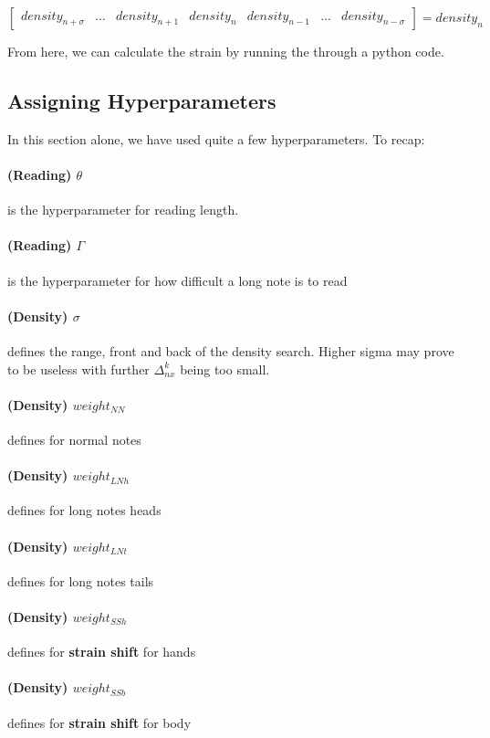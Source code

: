 $$
\begin{bmatrix}
	density_{n+\sigma} & \dots & density_{n+1} & density_{n} & density_{n-1} & \dots & density_{n-\sigma} 
\end{bmatrix}
= density_n
$$ 

From here, we can calculate the strain by running the through a python code.

\subsection{Assigning Hyperparameters}

In this section alone, we have used quite a few hyperparameters. To recap:

\paragraph{(Reading) $\theta$} is the hyperparameter for reading length.
\paragraph{(Reading) $\Gamma$} is the hyperparameter for how difficult a long note is to read

\paragraph{(Density) $\sigma$} defines the range, front and back of the density search. Higher sigma may prove to be useless with further $\Delta_{nx}^k$ being too small.

\paragraph{(Density) $weight_{NN}$} defines for normal notes
\paragraph{(Density) $weight_{LNh}$} defines for long notes heads
\paragraph{(Density) $weight_{LNt}$} defines for long notes tails
\paragraph{(Density) $weight_{SSh}$} defines for \textbf{strain shift} for hands
\paragraph{(Density) $weight_{SSb}$} defines for \textbf{strain shift} for body 

